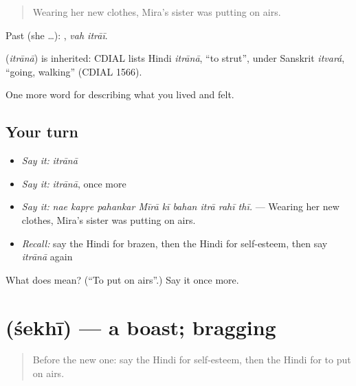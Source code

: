 \begin{quote}
Wearing her new clothes, Mira's sister was putting on airs.
\end{quote}

Past (she …):  , \emph{vah itrāī}.

\begin{cousinweb}
\textbf{} (\emph{itrānā}) is inherited: CDIAL lists Hindi \emph{itrānā}, \textquotedblleft{}to strut\textquotedblright{}, under Sanskrit \emph{itvará}, \textquotedblleft{}going, walking\textquotedblright{} (CDIAL 1566).
\end{cousinweb}

\begin{grammarlens}[title={What you've built}]
One more word for describing what you lived and felt.
\end{grammarlens}

\subsection*{Your turn}
\begin{itemize}
\raggedright
  \item \emph{Say it:} \emph{itrānā}
  \item \emph{Say it:} \emph{itrānā}, once more
  \item \emph{Say it:} \emph{nae kapṛe pahankar Mīrā kī bahan itrā rahī thī.} — Wearing her new clothes, Mira's sister was putting on airs.
  \item \emph{Recall:} say the Hindi for brazen, then the Hindi for self-esteem, then say \emph{itrānā} again
\end{itemize}

\begin{tcolorbox}[breakable,colback=teal!4,colframe=teal!35!black,title={Before you move on}]
What does  mean? (\textquotedblleft{}To put on airs\textquotedblright{}.) Say it once more.
\end{tcolorbox}
\section[\texorpdfstring{\hi{शेख़ी} (śekhī)}{शेख़ी (śekhī)}]{ (śekhī) — a boast; bragging}

\label{lesson:HI-C462-sekhi}



\begin{quote}
Before the new one: say the Hindi for self-esteem, then the Hindi for to put on airs.
\end{quote}

